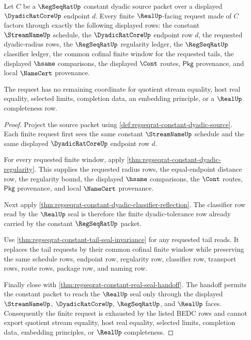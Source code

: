 \begin{theorem}
\label{thm:regseqrat-constant-dyadic-request-exhaustion}
Let $C$ be a $\RegSeqRatUp$ constant dyadic source packet over a displayed
$\DyadicRatCoreUp$ endpoint $d$. Every finite $\RealUp$-facing request made of
$C$ factors through exactly the following displayed rows: the constant
$\StreamNameUp$ schedule, the $\DyadicRatCoreUp$ endpoint row $d$, the
requested dyadic-radius rows, the $\RegSeqRatUp$ regularity ledger, the
$\RegSeqRatUp$ classifier ledger, the common cofinal finite window for the
requested tails, the displayed $\hsame$ comparisons, the displayed $\Cont$
routes, $\mathsf{Pkg}$ provenance, and local $\NameCert$ provenance.

The request has no remaining coordinate for quotient stream equality, host
real equality, selected limits, completion data, an embedding principle, or a
$\RealUp$ completeness row.
\end{theorem}
\begin{proof}
Project the source packet using
\autoref{def:regseqrat-constant-dyadic-source}. Each finite request first sees
the same constant $\StreamNameUp$ schedule and the same displayed
$\DyadicRatCoreUp$ endpoint row $d$.

For every requested finite window, apply
\autoref{thm:regseqrat-constant-dyadic-regularity}. This supplies the
requested radius rows, the equal-endpoint distance row, the regularity bound,
the displayed $\hsame$ comparisons, the $\Cont$ routes, $\mathsf{Pkg}$
provenance, and local $\NameCert$ provenance.

Next apply
\autoref{thm:regseqrat-constant-dyadic-classifier-reflection}. The classifier
row read by the $\RealUp$ seal is therefore the finite dyadic-tolerance row
already carried by the constant $\RegSeqRatUp$ packet.

Use \autoref{thm:regseqrat-constant-tail-seal-invariance} for any requested
tail reads. It replaces the tail requests by their common cofinal finite
window while preserving the same schedule rows, endpoint row, regularity row,
classifier row, transport rows, route rows, package row, and naming row.

Finally close with
\autoref{thm:regseqrat-constant-real-seal-handoff}. The handoff permits the
constant packet to reach the $\RealUp$ seal only through the displayed
$\StreamNameUp$, $\DyadicRatCoreUp$, $\RegSeqRatUp$, and $\RealUp$ faces.
Consequently the finite request is exhausted by the listed BEDC rows and
cannot export quotient stream equality, host real equality, selected limits,
completion data, embedding principles, or $\RealUp$ completeness.
\end{proof}

